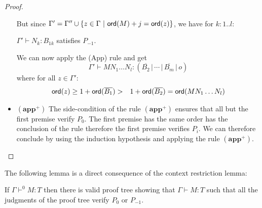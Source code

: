 \begin{proof}
\begin{itemize}
    But since $\Gamma' = \Gamma'' \cup \{ z \in \Gamma \ | \ {\sf ord}(M) + j = {\sf ord}(z)\}$, we have for $k : 1..l$:

    $\Gamma' \vdash N_k : B_{1k}$ satisfies $P_{-1}$.


    We can now apply the (App) rule and get
    $$\Gamma' \vdash M N_1 \ldots N_l : (\overline{B_2} \, | \, \cdots \, | \,
    \overline{B_m} \, | \, o)$$
    where for all $z\in \Gamma'$:
    \begin{eqnarray*}
    {\sf ord}(z) \geq 1 + {\sf ord}(\overline{B_1})
    &>& 1 + {\sf ord}(\overline{B_2}) = {\sf ord}(M N_1 \ldots N_l)
    \end{eqnarray*}

\item $\mathbf{(app^+)}$  The side-condition of the rule $\mathbf{(app^+)}$ ensures that all but the first premise verify $P_0$.
The first premise has the same order has the
conclusion of the rule therefore the first premise verifies
$P_{i}$. We can therefore conclude by using the induction hypothesis and applying the rule $\mathbf{(app^+)}$.
\end{itemize}
\end{proof}


The following lemma is a direct consequence of the context restriction lemma:
\begin{lem}
\label{lem:prooftree01only}
If $\Gamma \vdash^{0} M : T$ then there is valid proof tree
showing that $\Gamma \vdash M : T$ such that all the judgments
of the proof tree verify $P_0$ or $P_{-1}$.
\end{lem}


